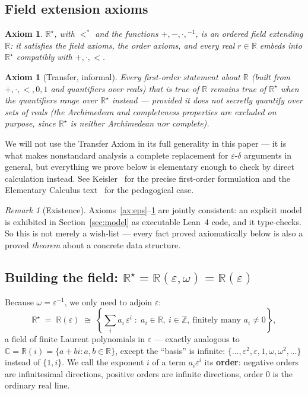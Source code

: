 \documentclass[11pt]{article}
\newtheorem{axiom}[theorem]{Axiom}
\theoremstyle{definition}
\theoremstyle{remark}
\newtheorem{remark}[theorem]{Remark}
\newcommand{\R}{\mathbb{R}}
\newcommand{\Z}{\mathbb{Z}}
\newcommand{\Rstar}{\mathbb{R}^{\star}}
\newcommand{\eps}{\varepsilon}
\begin{document}
\subsection{Field extension axioms}

\begin{axiom}\label{ax:field}
$\Rstar$, with $<^{\!*}$ and the functions $+,-,\cdot,{}^{-1}$, is an
ordered field extending $\R$: it satisfies the field axioms, the order
axioms, and every real $r\in \R$ embeds into $\Rstar$ compatibly with
$+,\cdot,<$.
\end{axiom}

\begin{axiom}[Transfer, informal]\label{ax:transfer}
Every first-order statement about $\R$ (built from $+,\cdot,<,0,1$ and
quantifiers over reals) that is true of $\R$ remains true of $\Rstar$ when
the quantifiers range over $\Rstar$ instead — \emph{provided} it does not
secretly quantify over sets of reals (the Archimedean and completeness
properties are excluded on purpose, since $\Rstar$ is neither
Archimedean nor complete).
\end{axiom}

We will not use the Transfer Axiom in its full generality in this paper —
it is what makes nonstandard analysis a complete replacement for
$\eps$-$\delta$ arguments in general, but everything we prove below is
elementary enough to check by direct calculation instead. See
Keisler~\cite{keisler-found} for the precise first-order formulation and
the Elementary Calculus text~\cite{keisler-calc} for the pedagogical case.

\begin{remark}[Existence]
Axioms~\ref{ax:eps}--\ref{ax:transfer} are jointly consistent: an explicit
model is exhibited in Section~\ref{sec:model} as executable Lean~4 code,
and it type-checks. So this is not merely a wish-list — every fact proved
axiomatically below is also a proved \emph{theorem} about a concrete
data structure.
\end{remark}

\subsection{Building the field: $\Rstar = \R(\eps,\omega) = \R(\eps)$}

Because $\omega = \eps^{-1}$, we only need to adjoin $\eps$:
\[
\Rstar \;=\; \R(\eps) \;\cong\; \left\{ \sum_{i} a_i\, \eps^{i} \;:\; a_i \in \R,\ i \in \Z,\ \text{finitely many } a_i \ne 0 \right\},
\]
a field of finite Laurent polynomials in $\eps$ — exactly analogous to
$\mathbb{C} = \R(i) = \{a+bi : a,b\in\R\}$, except the ``basis'' is
infinite: $\{\ldots,\eps^{2},\eps,1,\omega,\omega^{2},\ldots\}$ instead of
$\{1,i\}$. We call the exponent $i$ of a term $a_i\eps^i$ its \textbf{order}:
negative orders are infinitesimal directions, positive orders are infinite
directions, order $0$ is the ordinary real line.
\end{document}
